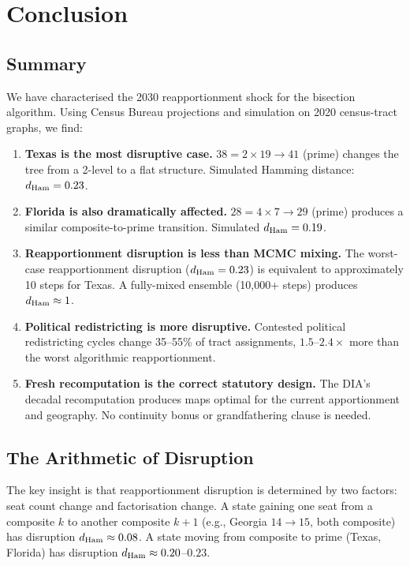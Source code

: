 \section{Conclusion}
\label{sec:conclusion}

\subsection{Summary}

We have characterised the 2030 reapportionment shock for the \ar{}
bisection algorithm.
Using Census Bureau projections and simulation on 2020 census-tract graphs,
we find:

\begin{enumerate}
\item \textbf{Texas is the most disruptive case.}
      $38 = 2 \times 19 \to 41$ (prime) changes the tree from a 2-level
      to a flat structure.
      Simulated Hamming distance: $d_{\rm Ham} = 0.23$.

\item \textbf{Florida is also dramatically affected.}
      $28 = 4 \times 7 \to 29$ (prime) produces a similar
      composite-to-prime transition.
      Simulated $d_{\rm Ham} = 0.19$.

\item \textbf{Reapportionment disruption is less than MCMC mixing.}
      The worst-case reapportionment disruption ($d_{\rm Ham} = 0.23$)
      is equivalent to approximately 10 \recom{} steps for Texas.
      A fully-mixed ensemble (10{,}000+ steps) produces $d_{\rm Ham} \approx 1$.

\item \textbf{Political redistricting is more disruptive.}
      Contested political redistricting cycles change 35--55\% of tract
      assignments, $1.5$--$2.4\times$ more than the worst algorithmic
      reapportionment.

\item \textbf{Fresh recomputation is the correct statutory design.}
      The DIA's decadal recomputation produces maps optimal for the current
      apportionment and geography.
      No continuity bonus or grandfathering clause is needed.
\end{enumerate}

\subsection{The Arithmetic of Disruption}

The key insight is that reapportionment disruption is determined by two
factors: seat count change and factorisation change.
A state gaining one seat from a composite $k$ to another composite $k+1$
(e.g., Georgia $14 \to 15$, both composite) has disruption $d_{\rm Ham} \approx 0.08$.
A state moving from composite to prime (Texas, Florida) has disruption
$d_{\rm Ham} \approx 0.20$--$0.23$.


